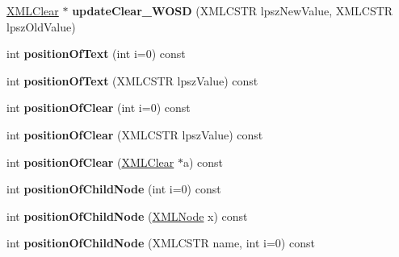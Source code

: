 \begin{DoxyCompactItemize}
\hyperlink{struct_x_m_l_clear}{X\+M\+L\+Clear} $\ast$ {\bfseries update\+Clear\+\_\+\+W\+O\+SD} (X\+M\+L\+C\+S\+TR lpsz\+New\+Value, X\+M\+L\+C\+S\+TR lpsz\+Old\+Value)
\item 
\mbox{\label{struct_x_m_l_node_a3037f2fb4ce172d3f5156d9707af5c10}} 
int {\bfseries position\+Of\+Text} (int i=0) const
\item 
\mbox{\label{struct_x_m_l_node_a23d8731aafccd6153a3a7351a80b278e}} 
int {\bfseries position\+Of\+Text} (X\+M\+L\+C\+S\+TR lpsz\+Value) const
\item 
\mbox{\label{struct_x_m_l_node_a5ac10cf45468302f26d4932bf4678a95}} 
int {\bfseries position\+Of\+Clear} (int i=0) const
\item 
\mbox{\label{struct_x_m_l_node_ab0cab901f9feff22a76929d011e7a08d}} 
int {\bfseries position\+Of\+Clear} (X\+M\+L\+C\+S\+TR lpsz\+Value) const
\item 
\mbox{\label{struct_x_m_l_node_a04d7989f7a460a1bcd200be5376e2467}} 
int {\bfseries position\+Of\+Clear} (\hyperlink{struct_x_m_l_clear}{X\+M\+L\+Clear} $\ast$a) const
\item 
\mbox{\label{struct_x_m_l_node_a325d7fa417ea2461e03792386cbebdef}} 
int {\bfseries position\+Of\+Child\+Node} (int i=0) const
\item 
\mbox{\label{struct_x_m_l_node_a1e28b439f9616c680fd0af893de67c01}} 
int {\bfseries position\+Of\+Child\+Node} (\hyperlink{struct_x_m_l_node}{X\+M\+L\+Node} x) const
\item 
\mbox{\label{struct_x_m_l_node_a4a03f749176c9b4ddc680bf76c304b0c}} 
int {\bfseries position\+Of\+Child\+Node} (X\+M\+L\+C\+S\+TR name, int i=0) const
\end{DoxyCompactItemize}
